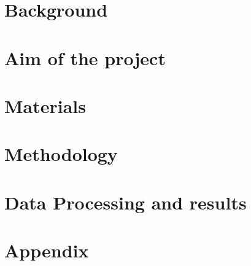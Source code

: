 

\raggedbottom %



\frontmatter	 %


\newpage
\clearpage

\newpage

\tableofcontents*												%

\mainmatter
\chapter{Background} 



\chapter{Aim of the project}


\chapter{Materials}




\chapter{Methodology}



\chapter{Data Processing and results}


\begingroup
\raggedright


%
%

\endgroup

\appendix
\chapter{Appendix}


